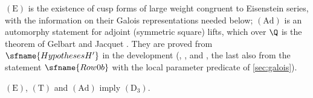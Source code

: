 $(\mathrm{E})$ is the existence of cusp forms of large weight congruent to Eisenstein series, with the information on their
Galois representations needed below; $(\mathrm{Ad})$ is an automorphy statement for adjoint (symmetric square) lifts, which over
$\Q$ is the theorem of Gelbart and Jacquet \cite{GelbartJacquet1978}. They are proved from $\sfname{HypothesesH'}$ in the development
(, , and
, the last also from the statement $\sfname{Row0b}$ with the
local parameter predicate of \cref{sec:galois}).

\begin{proposition}\label{pf:eis:denseprop}
$(\mathrm{E})$, $(\mathrm{T})$ and $(\mathrm{Ad})$ imply $(\mathrm{D}_3)$.
\end{proposition}

